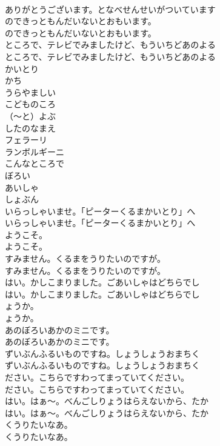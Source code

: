 \documentclass[8pt]{extreport}
\begin{document}
\begin{CJK}{UTF8}{min}
\\	ありがとうございます。となべせんせいがついています
\\	のできっともんだいないとおもいます。
\\	のできっともんだいないとおもいます。
\\	ところで、テレビでみましたけど、もういちどあのよる
\\	ところで、テレビでみましたけど、もういちどあのよる
\\	かいとり
\\	かち
\\	うらやましい
\\	こどものころ
\\	（～と）よぶ
\\	したのなまえ
\\	フェラーリ
\\	ランボルギーニ
\\	こんなところで
\\	ぼろい
\\	あいしゃ
\\	しょぶん
\\	いらっしゃいませ。「ピーターくるまかいとり」へ
\\	いらっしゃいませ。「ピーターくるまかいとり」へ
\\	ようこそ。
\\	ようこそ。
\\	すみません。くるまをうりたいのですが。
\\	すみません。くるまをうりたいのですが。
\\	はい。かしこまりました。ごあいしゃはどちらでし
\\	はい。かしこまりました。ごあいしゃはどちらでし
\\	ょうか。
\\	ょうか。
\\	あのぼろいあかのミニです。
\\	あのぼろいあかのミニです。
\\	ずいぶんふるいものですね。しょうしょうおまちく
\\	ずいぶんふるいものですね。しょうしょうおまちく
\\	ださい。こちらですわってまっていてください。
\\	ださい。こちらですわってまっていてください。
\\	はい。はぁ～。べんごしりょうはらえないから、たか
\\	はい。はぁ～。べんごしりょうはらえないから、たか
\\	くうりたいなあ。
\\	くうりたいなあ。

\end{CJK}
\end{document}
